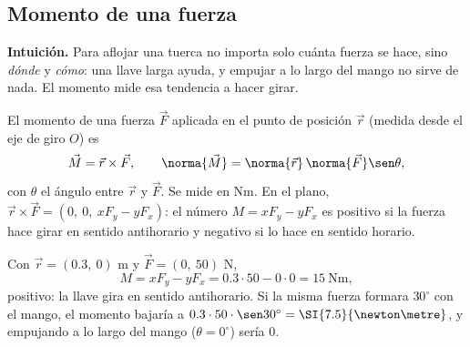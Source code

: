 \documentclass[11pt,a4paper]{article}
\newcommand{\vF}{\vec{F}}\newcommand{\vr}{\vec{r}}\newcommand{\vd}{\vec{d}}\newcommand{\vR}{\vec{R}}
\newcommand{\vM}{\vec{M}}
\begin{document}
\subsection{Momento de una fuerza}
\textbf{Intuición.} Para aflojar una tuerca no importa solo cuánta fuerza se hace, sino \emph{dónde} y \emph{cómo}: una
llave larga ayuda, y empujar a lo largo del mango no sirve de nada. El momento mide esa tendencia a hacer girar.

\begin{definicion}
El momento de una fuerza $\vF$ aplicada en el punto de posición $\vr$ (medida desde el eje de giro $O$) es
\[ \vM=\vr\times\vF,\qquad \norma{\vM}=\norma{\vr}\,\norma{\vF}\sen\theta , \]
con $\theta$ el ángulo entre $\vr$ y $\vF$. Se mide en $\si{\newton\metre}$. En el plano,
$\vr\times\vF=\left(0,\ 0,\ xF_y-yF_x\right)$: el número $M=xF_y-yF_x$ es positivo si la fuerza hace girar en
sentido antihorario y negativo si lo hace en sentido horario.
\end{definicion}

\begin{minipage}[c]{0.52\linewidth}
\begin{ejemplo}
Con $\vr=(0.3,\ 0)$ m y $\vF=(0,\ 50)$ N,
\[ M=xF_y-yF_x=0.3\cdot50-0\cdot0=\SI{15}{\newton\metre}, \]
positivo: la llave gira en sentido antihorario. Si la misma fuerza formara $30^\circ$ con el mango, el momento
bajaría a $0.3\cdot50\cdot\sen30^\circ=\SI{7.5}{\newton\metre}$, y empujando a lo largo del mango ($\theta=0^\circ$) sería $0$.
\end{ejemplo}
\end{minipage}\hfill
\begin{minipage}[c]{0.44\linewidth}\centering
{}
\end{minipage}
\end{document}

